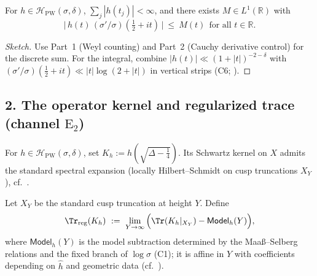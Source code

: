 \begin{lemma}\relax\hspace{0pt}
\label{lem:tfc3-L1} %
For $h\in\mathcal{H}_{\mathrm{PW}}(\sigma,\delta)$, $\sum_j |h(t_j)|<\infty$, and there exists $M\in L^1(\mathbb{R})$ with
\[
\big|\,h(t)\,(\sigma'/\sigma)(\tfrac12+it)\,\big|\ \le\ M(t)\ \ \text{for all }t\in\mathbb{R}.
\]
\end{lemma}

\begin{proof}[Sketch]\relax\hspace{0pt}
Use Part~1 (Weyl counting) and Part~2 (Cauchy derivative control) for the discrete sum. For the integral, combine $|h(t)|\ll(1+|t|)^{-2-\delta}$ with $(\sigma'/\sigma)(\tfrac12+it)\ll|t|\log(2+|t|)$ in vertical strips (C6; \cite{IwaniecSpectral,Borthwick}).\relax\hspace{0pt}
\end{proof}

\subsection*{2. The operator kernel and regularized trace (channel \texorpdfstring{$\mathrm{E}_2$}{E2})}\relax\hspace{0pt}
\label{subsec:tfc3-E2} %

\begin{definition}\relax\hspace{0pt}
\label{def:tfc3-Kh} %
For $h\in\mathcal{H}_{\mathrm{PW}}(\sigma,\delta)$, set $K_h:=h(\sqrt{\Delta-\tfrac14})$. Its Schwartz kernel on $X$ admits the standard spectral expansion (locally Hilbert--Schmidt on cusp truncations $X_Y$), cf.\ \cite{HejhalII,Borthwick}.\relax\hspace{0pt}
\end{definition}

\begin{definition}\relax\hspace{0pt}
\label{def:tfc3-trreg} %
Let $X_Y$ be the standard cusp truncation at height $Y$. Define
\begin{equation}\relax\hspace{0pt}
\label{eq:tfc3-trreg}\relax\hspace{0pt}
\Tr_{\mathrm{reg}}(K_h)\ :=\ \lim_{Y\to\infty}\Big(\Tr(K_h|_{X_Y}) - \mathsf{Model}_h(Y)\Big),
\end{equation}
where $\mathsf{Model}_h(Y)$ is the model subtraction determined by the Maaß--Selberg relations and the fixed branch of $\log\sigma$ (C1); it is affine in $Y$ with coefficients depending on $\widehat{h}$ and geometric data (cf.\ \cite{LaxPhillips,Borthwick}).\relax\hspace{0pt}
\end{definition}

